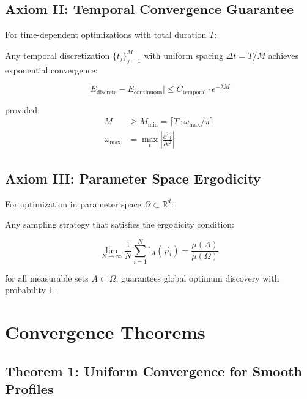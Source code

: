 \documentclass[12pt,a4paper]{article}
\begin{document}
\subsection{Axiom II: Temporal Convergence Guarantee}

For time-dependent optimizations with total duration $T$:

\begin{axiom}
Any temporal discretization $\{t_j\}_{j=1}^M$ with uniform spacing $\Delta t = T/M$ achieves exponential convergence:

\begin{equation}
\left|E_{\text{discrete}} - E_{\text{continuous}}\right| \leq C_{\text{temporal}} \cdot e^{-\lambda M}
\end{equation}

provided:
\begin{align}
M &\geq M_{\text{min}} = \lceil T \cdot \omega_{\text{max}} / \pi \rceil \\
\omega_{\text{max}} &= \max_t \left|\frac{\partial^2 f}{\partial t^2}\right|
\end{align}
\end{axiom}

\subsection{Axiom III: Parameter Space Ergodicity}

For optimization in parameter space $\Omega \subset \mathbb{R}^d$:

\begin{axiom}
Any sampling strategy that satisfies the ergodicity condition:

\begin{equation}
\lim_{N \to \infty} \frac{1}{N} \sum_{i=1}^N \mathbb{I}_A(\vec{p}_i) = \frac{\mu(A)}{\mu(\Omega)}
\end{equation}

for all measurable sets $A \subset \Omega$, guarantees global optimum discovery with probability 1.
\end{axiom}

\section{Convergence Theorems}

\subsection{Theorem 1: Uniform Convergence for Smooth Profiles}
\end{document}
